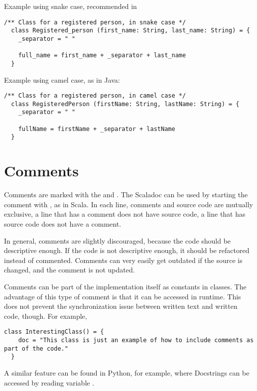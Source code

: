 Example using snake case, recommended in \Soda

\begin{lstlisting}[label={lst:exampleExtendsSnakeCase}]
  /** Class for a registered person, in snake case */
  class Registered_person (first_name: String, last_name: String) = {
    _separator = " "

    full_name = first_name + _separator + last_name
  }
\end{lstlisting}

Example using camel case, as in Java:
\begin{lstlisting}[label={lst:exampleExtendsCamelCase}]
  /** Class for a registered person, in camel case */
  class RegisteredPerson (firstName: String, lastName: String) = {
    _separator = " "

    fullName = firstName + _separator + lastName
  }
\end{lstlisting}


\section{Comments}

Comments are marked with the \srccode{/*} and  \srccode{*/}.
The Scaladoc can be used by starting the comment with \srccode{/**}, as in Scala.
In each line, comments and source code are mutually exclusive, a line that has a comment does not have source code, a line that has source code does not have a comment.

In general, comments are slightly discouraged, because the code should be descriptive enough.
If the code is not descriptive enough, it should be refactored instead of commented.
Comments can very easily get outdated if the source is changed, and the comment is not updated.

Comments can be part of the implementation itself as constants in classes.
The advantage of this type of comment is that it can be accessed in runtime.
This does not prevent the synchronization issue between written text and written code, though.
For example,

\begin{lstlisting}[label={lst:exampleClassWithComment}]
  class InterestingClass() = {
    doc = "This class is just an example of how to include comments as part of the code."
  }
\end{lstlisting}

A similar feature can be found in Python, for example, where Docstrings can be accessed by reading variable .


